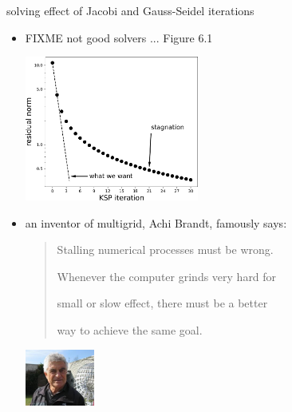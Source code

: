\documentclass[10pt,
               svgnames,
               hyperref={colorlinks,citecolor=DeepPink4,linkcolor=FireBrick,urlcolor=Maroon},
               usepdftitle=false]{beamer}
\begin{document}
\begin{frame}{solving effect of Jacobi and Gauss-Seidel iterations}
\begin{itemize}
\item FIXME not good solvers ... Figure 6.1

\hfill \includegraphics[width=0.45\textwidth]{images/stagnation.png}

\item an inventor of multigrid, Achi Brandt, famously says:
\begin{quotation}
Stalling numerical processes must be wrong.

Whenever the computer grinds very hard for

small or slow effect, there must be a better

way to achieve the same goal.
\end{quotation}

\vspace{-19mm}
\hfill \includegraphics[width=0.18\textwidth]{images/abrandt.jpg}
\end{itemize}
\end{frame}
\end{document}
